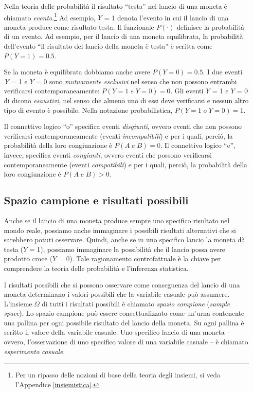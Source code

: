 \documentclass[
  11pt,
]{krantz}
\theoremstyle{definition}
\theoremstyle{definition}
\theoremstyle{definition}
\theoremstyle{definition}
\theoremstyle{remark}
\begin{document}
Nella teoria delle probabilità il risultato ``testa'' nel lancio di una moneta è chiamato \emph{evento}.\footnote{Per un ripasso delle nozioni di base della teoria degli insiemi, si veda l'Appendice \ref{insiemistica}.} Ad esempio, \(Y\) = 1 denota l'evento in cui il lancio di una moneta produce come risultato testa. Il funzionale \(P(·)\) definisce la probabilità di un evento. Ad esempio, per il lancio di una moneta equilibrata, la probabilità dell'evento ``il risultato del lancio della moneta è testa'' è scritta come \(P(Y = 1) = 0.5.\)

Se la moneta è equilibrata dobbiamo anche avere \(P(Y = 0) = 0.5\). I due eventi \emph{Y} = 1 e \(Y\) = 0 sono \emph{mutuamente esclusivi} nel senso che non possono entrambi verificarsi contemporaneamente: \(P(Y = 1\; e \; Y = 0) = 0.\) Gli eventi \(Y\) = 1 e \(Y\) = 0 di dicono \emph{esaustivi}, nel senso che almeno uno di essi deve verificarsi e nessun altro tipo di evento è possibile. Nella notazione probabilistica, \(P(Y = 1\; o \; Y = 0) = 1.\)

Il connettivo logico ``o'' specifica eventi \emph{disgiunti}, ovvero eventi che non possono verificarsi contemporaneamente (eventi \emph{incompatibili}) e per i quali, perciò, la probabilità della loro congiunzione è \(P(A \; e \; B) = 0\). Il connettivo logico ``e'', invece, specifica eventi \emph{congiunti}, ovvero eventi che possono verificarsi contemporaneamente (eventi \emph{compatibili}) e per i quali, perciò, la probabilità della loro congiunzione è \(P(A \; e \; B) > 0\).

\hypertarget{spazio-campione-e-risultati-possibili}{%
\subsection{Spazio campione e risultati possibili}\label{spazio-campione-e-risultati-possibili}}

Anche se il lancio di una moneta produce sempre uno specifico risultato nel mondo reale, possiamo anche immaginare i possibili risultati alternativi che si sarebbero potuti osservare. Quindi, anche se in uno specifico lancio la moneta dà testa (\(Y\) = 1), possiamo immaginare la possibilità che il lancio possa avere prodotto croce (\(Y\) = 0). Tale ragionamento controfattuale è la chiave per comprendere la teoria delle probabilità e l'inferenza statistica.

I risultati possibili che si possono osservare come conseguenza del lancio di una moneta determinano i valori possibili che la variabile casuale può assumere. L'insieme \(\Omega\) di tutti i risultati possibili è chiamato \emph{spazio campione} (\emph{sample space}). Lo spazio campione può essere concettualizzato come un'urna contenente una pallina per ogni possibile risultato del lancio della moneta. Su ogni pallina è scritto il valore della variabile casuale. Uno specifico lancio di una moneta -- ovvero, l'osservazione di uno specifico valore di una variabile casuale -- è chiamato \emph{esperimento casuale}.
\end{document}

